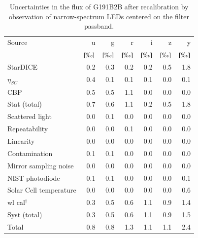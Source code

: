 \begin{table}
  \centering
  \caption{Uncertainties in the flux of G191B2B after recalibration by observation of narrow-spectrum LEDs centered on the filter passband.}
  \label{tab:led}
  \begin{tabular}{@{}l@{}rrrrrr@{}}
    \toprule
    Source & u & g & r & i & z & y \\
           & $[\text{\textperthousand}]$ & $[\text{\textperthousand}]$ & $[\text{\textperthousand}]$ & $[\text{\textperthousand}]$ & $[\text{\textperthousand}]$ & $[\text{\textperthousand}]$\\
    \midrule
    StarDICE & 0.2 & 0.3 & 0.2 & 0.2 & 0.5 & 1.8 \\
    $\eta_{SC}$ & 0.4 & 0.1 & 0.1 & 0.1 & 0.0 & 0.1 \\
    CBP & 0.5 & 0.5 & 1.1 & 0.0 & 0.0 & 0.0 \\
    \midrule
    Stat (total) & 0.7 & 0.6 & 1.1 & 0.2 & 0.5 & 1.8 \\
    \midrule
    Scattered light & 0.0 & 0.1 & 0.0 & 0.0 & 0.0 & 0.0 \\
    Repeatability & 0.0 & 0.0 & 0.1 & 0.0 & 0.0 & 0.0 \\
    Linearity & 0.0 & 0.0 & 0.0 & 0.0 & 0.0 & 0.0 \\
    Contamination & 0.1 & 0.1 & 0.0 & 0.0 & 0.0 & 0.0 \\
    Mirror sampling noise & 0.0 & 0.0 & 0.0 & 0.0 & 0.0 & 0.0 \\
    NIST photodiode & 0.1 & 0.1 & 0.0 & 0.0 & 0.0 & 0.1 \\
    Solar Cell temperature & 0.0 & 0.0 & 0.0 & 0.0 & 0.0 & 0.6 \\
    wl cal$^\dag$ & 0.3 & 0.5 & 0.6 & 1.1 & 0.9 & 1.4 \\
    \midrule
    Syst (total) & 0.3 & 0.5 & 0.6 & 1.1 & 0.9 & 1.5 \\
    \midrule
    Total & 0.8 & 0.8 & 1.3 & 1.1 & 1.1 & 2.4 \\
    \bottomrule
  \end{tabular}
  
\end{table}


